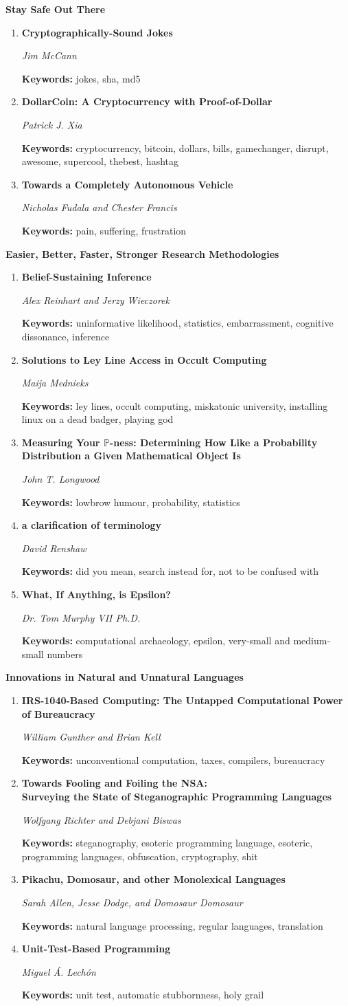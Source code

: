 \documentclass[letter]{article}
\newcommand\track[2]{\center {\Large \bf \em \sc Track #1} \vspace{0.2in}

{\huge \bf #2} \vspace{0.15in}
\thispagestyle{empty}}
\newcommand\paper[2]{\vspace{0.15in} \item {\Large \bf \sf #1}

{\large \em \sf #2}}
\newcommand\keywords[1]{

{\small {\bf Keywords:} #1}}
\begin{document}
\newpage

\track{8,888}{Stay Safe Out There}

\begin{enumerate}
\paper{Cryptographically-Sound Jokes}
{Jim McCann}
\keywords{jokes, sha, md5}
\paper{DollarCoin: A Cryptocurrency with Proof-of-Dollar}
{Patrick J. Xia}
\keywords{cryptocurrency,
bitcoin,
dollars,
bills,
gamechanger,
disrupt,
awesome,
supercool,
thebest,
hashtag}
\paper{Towards a Completely Autonomous Vehicle}
{Nicholas Fudala and Chester Francis}
\keywords{pain, suffering, frustration}
\end{enumerate}

\newpage

\track{88,888}{Easier, Better, Faster, Stronger Research Methodologies}
\begin{enumerate}
\paper{Belief-Sustaining Inference}
{Alex Reinhart and Jerzy Wieczorek}
\keywords{uninformative likelihood,
statistics,
embarrassment,
cognitive dissonance,
inference}
\paper{Solutions to Ley Line Access in Occult Computing}
{Maija Mednieks}
\keywords{ley lines,
occult computing,
miskatonic university,
installing linux on a dead badger,
playing god}
\paper{Measuring Your $\mathbb{P}$-ness: Determining How Like a Probability Distribution a Given Mathematical Object Is}
{John T. Longwood}
\keywords{lowbrow humour,
probability,
statistics}
\paper{a clarification of terminology}
{David Renshaw}
\keywords{did you mean,
search instead for,
not to be confused with}
\paper{What, If Anything, is Epsilon?}
{Dr. Tom Murphy VII Ph.D.}
\keywords{computational archaeology,
epsilon,
very-small and medium-small numbers}
\end{enumerate}

\newpage

\track{888,888}{Innovations in Natural and Unnatural Languages}
\begin{enumerate}
\paper{IRS-1040-Based Computing: The Untapped Computational Power of Bureaucracy}
{William Gunther and Brian Kell}
\keywords{unconventional computation,
taxes,
compilers,
bureaucracy}
\paper{Towards Fooling and Foiling the NSA: \\
Surveying the State of Steganographic Programming Languages}
{Wolfgang Richter and Debjani Biswas}
\keywords{steganography,
esoteric programming language,
esoteric,
programming languages,
obfuscation,
cryptography,
shit}
\paper{Pikachu, Domosaur, and other Monolexical Languages}
{Sarah Allen, Jesse Dodge, and Domosaur Domosaur}
\keywords{natural language processing,
regular languages,
translation}
\paper{Unit-Test-Based Programming}
{Miguel \'{A}. Lech\'{o}n}
\keywords{unit test,
automatic stubbornness,
holy grail}
\end{enumerate}
\end{document}

